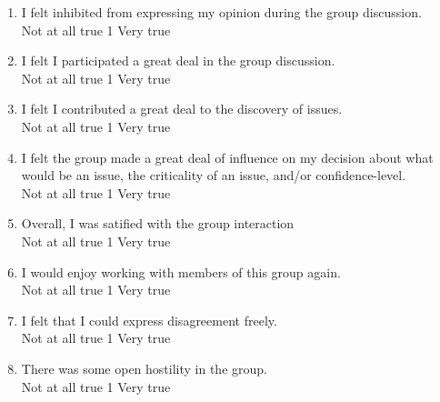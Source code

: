 \begin {enumerate}
\item I felt inhibited from expressing my opinion during the group discussion. 
\\
Not at all true \hfill 1     \hfill Very true\\


\item I felt I participated a great deal in the group discussion.
\\
Not at all true \hfill 1     \hfill Very true\\

\item I felt I contributed a great deal to the discovery of issues.
\\
Not at all true \hfill 1     \hfill Very true\\

\item I felt the group made a great deal of influence on my decision
about what would be an issue, the criticality of an issue, and/or confidence-level.
\\
Not at all true \hfill 1     \hfill Very true\\

\item Overall, I was satified with the group interaction
\\
Not at all true \hfill 1     \hfill Very true\\


\item I would enjoy working with members of this group again.
\\
Not at all true \hfill 1     \hfill Very true\\


\item I felt that I could express disagreement freely.
\\
Not at all true \hfill 1     \hfill Very true\\


\item There was some open hostility in the group.
\\
Not at all true \hfill 1     \hfill Very true\\



\end{enumerate}
